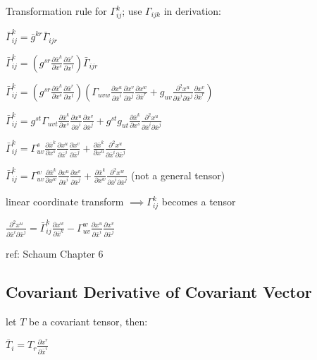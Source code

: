 \documentclass[8pt,letter]{article}
\begin{document}
\begin{multicols*}{2}
  Transformation rule for $\Gamma_{ij}^k$; use $\Gamma_{ijk}$ in derivation:
  
  $\bar{\Gamma}_{ij}^k = \bar{g}^{kr} \bar{\Gamma}_{ijr}$

  $\bar{\Gamma}_{ij}^k = \left(g^{sr} \frac{\partial \bar{x}^k}{\partial x^s} \frac{\partial \bar{x}^r}{\partial x^t}\right) \bar{\Gamma}_{ijr}$

  $\bar{\Gamma}_{ij}^k = \left(g^{sr} \frac{\partial \bar{x}^k}{\partial x^s} \frac{\partial \bar{x}^r}{\partial x^t}\right) \left(\Gamma_{uvw} \frac{\partial x^u}{\partial \bar{x}^i} \frac{\partial x^v}{\partial \bar{x}^j} \frac{\partial x^w}{\partial \bar{x}^r} + g_{uv} \frac{\partial^2 x^u}{\partial \bar{x}^i \partial \bar{x}^j} \frac{\partial x^v}{\partial \bar{x}^r} \right)$

  $\bar{\Gamma}_{ij}^k = g^{st} \Gamma_{uvt} \frac{\partial \bar{x}^k}{\partial x^s} \frac{\partial x^u}{\partial \bar{x}^i} \frac{\partial x^v}{\partial \bar{x}^j} + g^{st} g_{ut} \frac{\partial \bar{x}^k}{\partial x^s} \frac{\partial^2 x^u}{\partial \bar{x}^i \partial \bar{x}^j}$

  $\bar{\Gamma}_{ij}^k = \Gamma_{uv}^s \frac{\partial \bar{x}^k}{\partial x^s} \frac{\partial x^u}{\partial \bar{x}^i} \frac{\partial x^v}{\partial \bar{x}^j} + \frac{\partial \bar{x}^k}{\partial x^u} \frac{\partial^2 x^u}{\partial \bar{x}^i \partial \bar{x}^j}$

  $\bar{\Gamma}_{ij}^k = \Gamma_{uv}^w \frac{\partial \bar{x}^k}{\partial x^w} \frac{\partial x^u}{\partial \bar{x}^i} \frac{\partial x^v}{\partial \bar{x}^j} + \frac{\partial \bar{x}^k}{\partial x^w} \frac{\partial^2 x^w}{\partial \bar{x}^i \partial \bar{x}^j}$ (not a general tensor)

  linear coordinate transform $\implies \Gamma_{ij}^k$ becomes a tensor

  $\frac{\partial^2 x^u}{\partial \bar{x}^i \partial \bar{x}^j} = \bar{\Gamma}_{ij}^k \frac{\partial x^w}{\partial \bar{x}^k} - \Gamma_{uv}^w \frac{\partial x^u}{\partial \bar{x}^i} \frac{\partial x^v}{\partial \bar{x}^j}$

  ref: Schaum Chapter 6
  
  \subsection{Covariant Derivative of Covariant Vector}

  let $T$ be a covariant tensor, then:

  $\bar{T}_i = T_r \frac{\partial x^r}{\partial \bar{x}^i}$


\end{multicols*}
\end{document}
